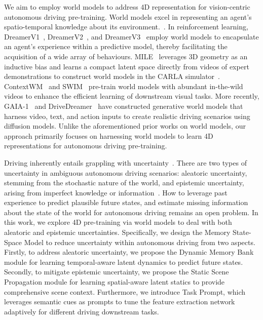 We aim to employ world models to address 4D  representation for vision-centric autonomous driving pre-training. World models excel in representing an agent's spatio-temporal knowledge about its environment.~\cite{lecun,world_models}. In reinforcement learning, DreamerV1~\cite{dreamerv1}, DreamerV2~\cite{dreamerv2}, and DreamerV3~\cite{dreamerv3} employ world models to encapsulate an agent's experience within a predictive model, thereby facilitating the acquisition of a wide array of behaviours. MILE~\cite{mile} leverages 3D geometry as an inductive bias and learns a compact latent space directly from videos of expert demonstrations to construct world models in the CARLA simulator~\cite{carla}. ContextWM~\cite{contextwm} and SWIM~\cite{swim} pre-train world models with abundant in-the-wild videos to enhance the efficient learning of downstream visual tasks. More recently, GAIA-1~\cite{gaia} and DriveDreamer~\cite{drivedreamer} have constructed generative world models that harness video, text, and action inputs to create realistic driving scenarios using diffusion models. Unlike the aforementioned prior works on world models, our approach primarily focuses on harnessing world models to learn 4D representations for autonomous driving pre-training.

Driving inherently entails grappling with uncertainty~\cite{hu}. There are two types of uncertainty in ambiguous autonomous driving scenarios: aleatoric uncertainty, stemming from the stochastic nature of the world, and epistemic uncertainty, arising from imperfect knowledge or information~\cite{uncertainty}. How to leverage past experience to predict plausible future states, and estimate missing information about the state of the world for autonomous driving remains an open problem. In this work, we explore 4D pre-training via world models to deal with both aleatoric and epistemic uncertainties. Specifically, we design the Memory State-Space Model to reduce uncertainty within autonomous driving from two aspects. Firstly, to address aleatoric uncertainty, we propose the Dynamic Memory Bank module for learning temporal-aware latent dynamics to predict future states. Secondly, to mitigate epistemic uncertainty, we propose the Static Scene Propagation module for learning spatial-aware latent statics to provide comprehensive scene context. Furthermore, we introduce Task Prompt, which leverages semantic cues as prompts to tune the feature extraction network adaptively for different driving downstream tasks. 

